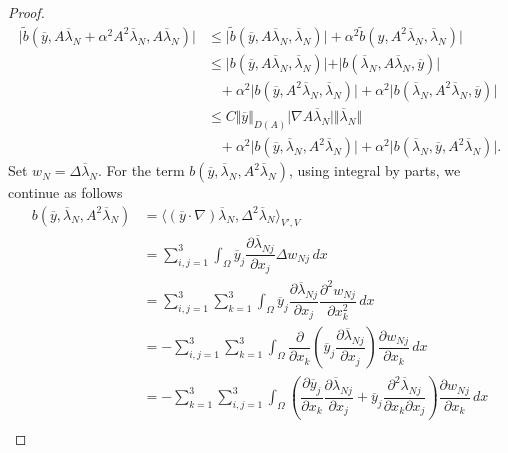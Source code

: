 \documentclass[reqno]{amsart}
\begin{document}
\begin{proof}
\begin{align*}
			\vert \widetilde{b} (\overline{y}, A\overline{\lambda}_N+ \alpha^2 A^2 \overline{\lambda}_N, A \overline{\lambda}_N) \vert &\leq \vert \widetilde{b}(\overline{y}, A\overline{\lambda}_N, \overline{\lambda}_N) \vert + \alpha^2 \widetilde{b}(y, A^2 \overline{\lambda}_N, \overline{\lambda}_N) \vert \\
			&\leq \vert b(\overline{y}, A\overline{\lambda}_N, \overline{\lambda}_N) \vert + \vert b(\overline{\lambda}_N, A\overline{\lambda}_N, \overline{y}) \vert \\
			&\hspace{10pt}+\alpha^2 \vert b(\overline{y}, A^2\overline{\lambda}_N, \overline{\lambda}_N) \vert + \alpha^2 \vert b(\overline{\lambda}_N, A^2 \overline{\lambda}_N, \overline{y}) \vert\\
			&\leq C \Vert \overline{y} \Vert_{D(A)} \vert \nabla A\overline{\lambda}_N \vert \Vert \overline{\lambda}_N \Vert \\
			&\hspace{10pt}+\alpha^2 \vert b(\overline{y}, \overline{\lambda}_N, A^2\overline{\lambda}_N) \vert + \alpha^2 \vert b(\overline{\lambda}_N,\overline{y}, A^2 \overline{\lambda}_N) \vert.
		\end{align*}
		Set $w_N=\Delta \overline{\lambda}_N$. For the term $b(\overline{y}, \overline{\lambda}_N, A^2\overline{\lambda}_N)$, using integral by parts, we continue as follows
		\begin{align*}
			b(\overline{y}, \overline{\lambda}_N, A^2\overline{\lambda}_N) &= \langle (\overline{y}\cdot\nabla)\overline{\lambda}_N,\Delta^2\overline{\lambda}_N\rangle_{V',V}\\
			&=\sum_{i,j=1}^3\int_\Omega \overline{y}_j \dfrac{\partial\overline{\lambda}_{Nj}}{\partial x_j}\Delta w_{Nj} \,dx\\
			&=\sum_{i,j=1}^3 \sum_{k=1}^3\int_\Omega \overline{y}_j \dfrac{\partial\overline{\lambda}_{Nj}}{\partial x_j}\dfrac{\partial^2w_{Nj}}{\partial x_k^2}\,dx\\
			&=-\sum_{i,j=1}^3 \sum_{k=1}^3\int_\Omega \dfrac{\partial}{\partial x_k}\left( \overline{y}_j \dfrac{\partial\overline{\lambda}_{Nj}}{\partial x_j}\right)\dfrac{\partial w_{Nj}}{\partial x_k}\,dx\\
			&=-\sum_{k=1}^3 \sum_{i,j=1}^3 \int_\Omega \left(\dfrac{\partial \overline{y}_j}{\partial x_k} \dfrac{\partial\overline{\lambda}_{Nj}}{\partial x_j} + \overline{y}_j\dfrac{\partial^2\overline{\lambda}_{Nj}}{\partial x_k\partial x_j}\right)\dfrac{\partial w_{Nj}}{\partial x_k} \,dx\\

\end{align*}
\end{proof}
\end{document}

